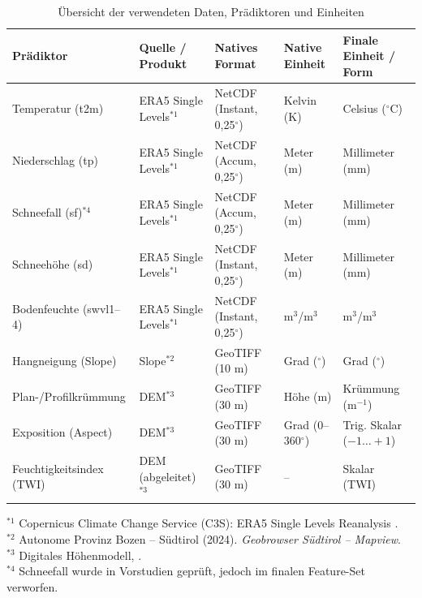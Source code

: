 \documentclass[../main.tex]{subfiles}
\begin{document}
\begin{table}[ht]
    \small
    \centering
    \caption{Übersicht der verwendeten Daten, Prädiktoren und Einheiten}
    \vspace{0.5cm}
    \renewcommand{\arraystretch}{1.25}
    \begin{tabular}{
        >{\centering\arraybackslash}m{3.5cm}
        >{\centering\arraybackslash}m{3.2cm}
        >{\centering\arraybackslash}m{3.0cm}
        >{\centering\arraybackslash}m{2.5cm}
        >{\centering\arraybackslash}m{3.0cm}
        }
        \toprule
        \textbf{Prädiktor}       & \textbf{Quelle / Produkt} & \textbf{Natives Format}          & \textbf{Native Einheit} & \textbf{Finale Einheit / Form} \\
        \midrule
        Temperatur (t2m)         & ERA5 Single Levels$^{*1}$ & NetCDF (Instant, 0{,}25$^\circ$) & Kelvin (K)              & Celsius ($^\circ$C)            \\
        Niederschlag (tp)        & ERA5 Single Levels$^{*1}$ & NetCDF (Accum, 0{,}25$^\circ$)   & Meter (m)               & Millimeter (mm)                \\
        Schneefall (sf)$^{*4}$   & ERA5 Single Levels$^{*1}$ & NetCDF (Accum, 0{,}25$^\circ$)   & Meter (m)               & Millimeter (mm)                \\
        Schneehöhe (sd)          & ERA5 Single Levels$^{*1}$ & NetCDF (Instant, 0{,}25$^\circ$) & Meter (m)               & Millimeter (mm)                \\
        Bodenfeuchte (swvl1--4)  & ERA5 Single Levels$^{*1}$ & NetCDF (Instant, 0{,}25$^\circ$) & m$^3$/m$^3$             & m$^3$/m$^3$                    \\
        Hangneigung (Slope)      & Slope$^{*2}$              & GeoTIFF (10 m)                   & Grad ($^\circ$)         & Grad ($^\circ$)                \\
        Plan-/Profilkrümmung     & DEM$^{*3}$                & GeoTIFF (30 m)                   & Höhe (m)                & Krümmung (m$^{-1}$)            \\
        Exposition (Aspect)      & DEM$^{*3}$                & GeoTIFF (30 m)                   & Grad (0--360$^\circ$)   & Trig. Skalar ($-1 \dots +1$)   \\
        Feuchtigkeitsindex (TWI) & DEM (abgeleitet)$^{*3}$   & GeoTIFF (30 m)                   & --                      & Skalar (TWI)                   \\
        \bottomrule
    \end{tabular}

    \vspace{0.3cm}
    \footnotesize
    $^{*1}$ Copernicus Climate Change Service (C3S): ERA5 Single Levels Reanalysis \autocite{ERA5HourlyData}.\\
    $^{*2}$ Autonome Provinz Bozen – Südtirol (2024). \textit{Geobrowser Südtirol – Mapview}.\\
    $^{*3}$ Digitales Höhenmodell, \autocite{opentopographyCopernicusGLO90Digital2021}.\\
    $^{*4}$ Schneefall wurde in Vorstudien geprüft, jedoch im finalen Feature-Set verworfen.
\end{table}
\end{document}
